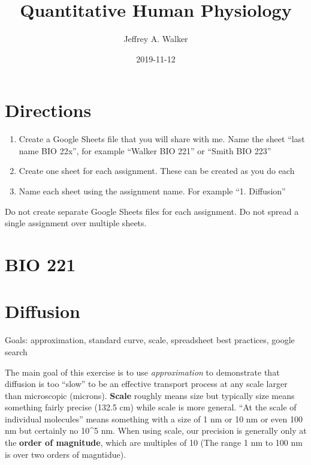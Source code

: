 \documentclass[]{book}
\title{Quantitative Human Physiology}
\author{Jeffrey A. Walker}
\date{2019-11-12}
\begin{document}
\maketitle

{
\setcounter{tocdepth}{1}
\tableofcontents
}
\chapter*{Directions}\label{directions}

\begin{enumerate}
\def\labelenumi{\arabic{enumi}.}
\item
  Create a Google Sheets file that you will share with me. Name the
  sheet ``last name BIO 22x'', for example ``Walker BIO 221'' or ``Smith
  BIO 223''
\item
  Create one sheet for each assignment. These can be created as you do
  each
\item
  Name each sheet using the assignment name. For example ``1.
  Diffusion''
\end{enumerate}

Do not create separate Google Sheets files for each assignment. Do not
spread a single assignment over multiple sheets.

\chapter*{BIO 221}\label{bio-221}

\chapter{Diffusion}\label{diffusion}

Goals: approximation, standard curve, scale, spreadsheet best practices,
google search

The main goal of this exercise is to use \emph{approximation} to
demonstrate that diffusion is too ``slow'' to be an effective transport
process at any scale larger than microscopic (microns). \textbf{Scale}
roughly means size but typically size means something fairly precise
(132.5 cm) while scale is more general. ``At the scale of individual
molecules'' means something with a size of 1 nm or 10 nm or even 100 nm
but certainly no 10\^{}5 nm. When using scale, our precision is
generally only at the \textbf{order of magnitude}, which are multiples
of 10 (The range 1 nm to 100 nm is over two orders of magntidue).
\end{document}
